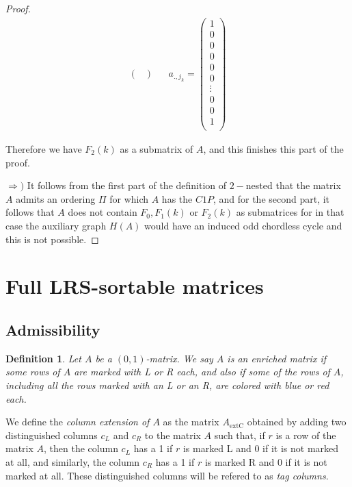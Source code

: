 \documentclass[a4paper,10pt]{report}
\theoremstyle{plain}
\theoremstyle{remark}
\theoremstyle{plain}
\newtheorem{defn}{Definition}[chapter]
\newcommand*{\extC}{\mathrm{extC}}
\begin{document}
\begin{proof}
{\begin{align*}
\begin{pmatrix}
		\end{pmatrix}
		&&
			a_{.,j_k} = \begin{pmatrix}
		1\\
		0\\
		0\\
		0\\
		0\\
		0\\
		\vdots \\
		0\\
		0\\
		1\\
		\end{pmatrix}
	\end{align*}
	}
	
	Therefore we have $F_2(k)$ as a submatrix of $A$, and this finishes this part of the proof.
	
	$ \Rightarrow )$ It follows from the first part of the definition of $2-$nested that the matrix $A$ admits an ordering $\Pi$ for which $A$
	has the $C1P$, and for the second part, it follows that $A$ does not contain $F_0, F_1(k)$ or $F_2(k)$ as submatrices for in that case the
	auxiliary graph $H(A)$ would have an induced odd chordless cycle and this is not possible. 
	
\end{proof}




\section{Full LRS-sortable matrices}

\subsection{Admissibility}

\begin{defn}
	Let $A$ be a $(0,1)$-matrix. We say $A$ is an \emph{enriched matrix} if some rows of $A$ are marked with L or R each, and also if some of the rows of $A$, including all the rows marked with an L or an R, are colored with blue or red each. 
\end{defn}

\vspace{2mm}

We define the \emph{column extension of $A$} as the matrix $A_{\extC}$ obtained by adding two distinguished columns $c_L$ and $c_R$ to the matrix $A$ such that, if $r$ is a row of the matrix $A$, then the column $c_L$ has a 1 if $r$ is marked L and 0 if it is not marked at all, and similarly, the column $c_R$ has a 1 if $r$ is marked R and 0 if it is not marked at all. These distinguished columns will be refered to as \emph{tag columns}.
\end{document}
